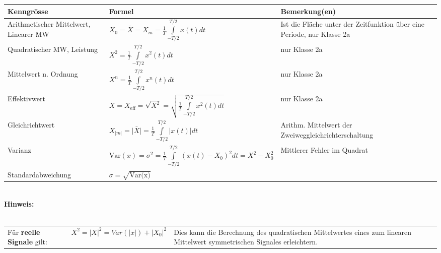 		\begin{tabularx}{\textwidth}{|p{4.7cm}|p{8.1cm}|X|}
			\hline
				\textbf{Kenngrösse}
			&	\textbf{Formel}
			&	\textbf{Bemerkung(en)}
			\\
			\hline
				Arithmetischer Mittelwert, Linearer MW
			&	$X_0 = \overline{X} = X_m = \frac {1} {T} \int\limits_{-T/2}^{T/2} x(t)dt$
			&	Ist die Fläche unter der Zeitfunktion über eine Periode, nur Klasse 2a
			\\
			\hline
				Quadratischer MW, Leistung
			&	$X^2 = \frac {1} {T} \int\limits_{-T/2}^{T/2} x^2(t)dt$
			& 	nur Klasse 2a
			\\
			\hline
				Mittelwert n. Ordnung
			&	$X^n = \frac {1} {T} \int\limits_{-T/2}^{T/2} x^n(t)dt$
			& 	nur Klasse 2a
			\\
			\hline
				Effektivwert
			&	$X = X_{\text{eff}}= \sqrt{X^2} = \sqrt{\frac{1}{T} \int\limits_{-T/2}^{T/2}{x^2(t)dt}}$
			&	nur Klasse 2a
			\\
			\hline
				Gleichrichtwert
			&	$X_{|m|} = \bar{|X|} = \frac{1}{T} \int\limits_{-T/2}^{T/2}{|x(t)| dt}$
			&	Arithm. Mittelwert der Zweiweggleichrichterschaltung
		    \\
		    \hline
				Varianz
			&	$\text{Var}(x)=\sigma^2= \frac {1} {T} \int\limits_{-T/2}^{T/2}(x(t)-X_0)^2dt = X^2-X_0^2$
			&	Mittlerer Fehler im Quadrat
			\\
			\hline
			Standardabweichung
			&	$\sigma = \sqrt{\text{Var(x)}}$
			&	{}
			\\
			\hline
		\end{tabularx} \\
	
		\textbf{Hinweis:} \\
		\\
		\begin{tabularx}{\textwidth}{llX}
			Für \textbf{reelle Signale} gilt: &
			$ X^2 = |X|^2 = Var(|x|) + |X_0|^2 $ &
			Dies kann die Berechnung des quadratischen Mittelwertes eines zum linearen Mittelwert symmetrischen Signales erleichtern.
		\end{tabularx}
		
		
